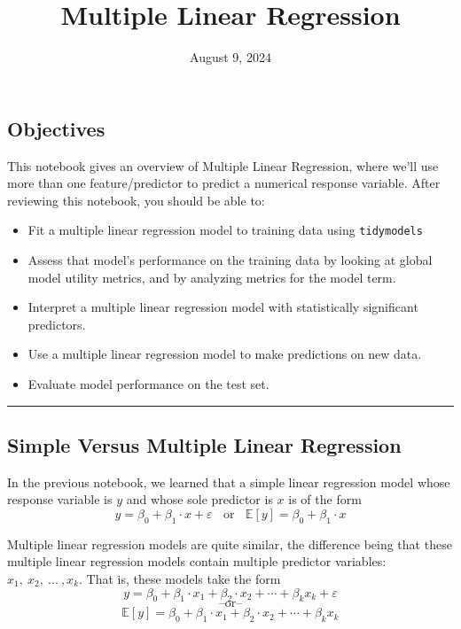 \documentclass[
  letterpaper,
  DIV=11,
  numbers=noendperiod]{scrartcl}
\title{Multiple Linear Regression}
\author{}
\date{August 9, 2024}
\providecommand{\tightlist}{%
  \setlength{\itemsep}{0pt}\setlength{\parskip}{0pt}}\usepackage{longtable,booktabs,array}
\renewcommand*\contentsname{Table of contents}
\newcommand\contentsname{Table of contents}
\begin{document}
\maketitle

\renewcommand*\contentsname{Table of contents}
{
\hypersetup{linkcolor=}
\setcounter{tocdepth}{3}
\tableofcontents
}
\subsection{Objectives}\label{objectives}

This notebook gives an overview of Multiple Linear Regression, where
we'll use more than one feature/predictor to predict a numerical
response variable. After reviewing this notebook, you should be able to:

\begin{itemize}
\tightlist
\item
  Fit a multiple linear regression model to training data using
  \texttt{tidymodels}
\item
  Assess that model's performance on the training data by looking at
  global model utility metrics, and by analyzing metrics for the model
  term.
\item
  Interpret a multiple linear regression model with statistically
  significant predictors.
\item
  Use a multiple linear regression model to make predictions on new
  data.
\item
  Evaluate model performance on the test set.
\end{itemize}

\begin{center}\rule{0.5\linewidth}{0.5pt}\end{center}

\subsection{Simple Versus Multiple Linear
Regression}\label{simple-versus-multiple-linear-regression}

In the previous notebook, we learned that a simple linear regression
model whose response variable is \(y\) and whose sole predictor is \(x\)
is of the form
\[y = \beta_0 + \beta_1\cdot x +\varepsilon ~~~~\text{or}~~~~\mathbb{E}\left[y\right] = \beta_0 + \beta_1\cdot x\]

Multiple linear regression models are quite similar, the difference
being that these multiple linear regression models contain multiple
predictor variables: \(x_1,~x_2,~...~,x_k\). That is, these models take
the form
\[y = \beta_0 + \beta_1\cdot x_1 + \beta_2\cdot x_2 + \cdots +\beta_k x_k +\varepsilon\]
\[~~~~\text{--or--}~~~~\]
\[\mathbb{E}\left[y\right] = \beta_0 + \beta_1\cdot x_1 + \beta_2\cdot x_2 + \cdots +\beta_k x_k\]
\end{document}
